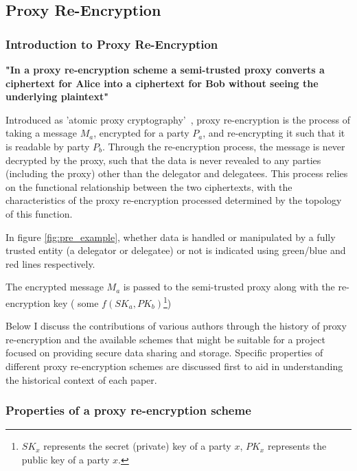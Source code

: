 \subsection{Proxy Re-Encryption}

\subsubsection{Introduction to Proxy Re-Encryption}

\begin{displayquote}{
  \textbf{"In a proxy re-encryption scheme a semi-trusted proxy converts a ciphertext for Alice into a ciphertext for Bob without seeing the underlying plaintext"}~\cite{greenateniese:2006:article}
}\end{displayquote}

Introduced as 'atomic proxy cryptography'~\cite{bbs:1998:book}, proxy re-encryption is the process of taking a message $M_a$, encrypted for a party $P_a$, and re-encrypting it such that it is readable by party $P_b$. Through the re-encryption process, the message is never decrypted by the proxy, such that the data is never revealed to any parties (including the proxy) other than the delegator and delegatees. This process relies on the functional relationship between the two ciphertexts, with the characteristics of the proxy re-encryption processed determined by the topology of this function.



In figure \ref{fig:pre_example}, whether data is handled or manipulated by a fully trusted entity (a delegator or delegatee) or not is indicated using green/blue and red lines respectively.

The encrypted message $M_a$ is passed to the semi-trusted proxy along with the re-encryption key ( some $f(SK_a, PK_b)$\footnote{$SK_x$ represents the secret (private) key of a party $x$, $PK_x$ represents the public key of a party $x$.})

Below I discuss the contributions of various authors through the history of proxy re-encryption and the available schemes that might be suitable for a project focused on providing secure data sharing and storage. Specific properties of different proxy re-encryption schemes are discussed first to aid in understanding the historical context of each paper.

\subsubsection{Properties of a proxy re-encryption scheme}

